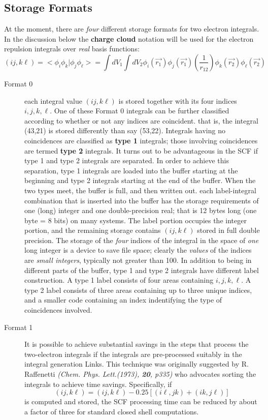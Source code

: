 \subsection{\sf Storage Formats}
At the moment, there are {\em four} different storage formats for two
electron integrals. In the  discussion below 
the {\bf charge cloud} notation will be used for
the electron repulsion integrals over {\em real} basis functions:
\[
(i j , k \ell ) =
 < \phi_i \phi_k | \phi_j \phi_{\ell} > = 
\int { dV_1 \int { dV_2 \phi_i (\vec{r_1})\phi_j (\vec{r_1})
\left ( \frac{1}{r_{12}} \right )
\phi_k (\vec{r_2})\phi_{\ell} (\vec{r_2}) } }
\]
\begin{description}
\item[Format 0] each integral value $(ij,k \ell )$ 
is stored together with its four
indices $ i , j , k , \ell $.
One of these Format 0 integrals can be further classified 
according to whether or not any
indices are coincident. that is, the integral (43,21) is stored
differently than say (53,22). Integrals having no coincidences are
classified as {\bf type 1} integrals; those involving coincidences are
termed {\bf type 2} integrals.
It turns out to be advantageous in the SCF if type 1 and type 2
integrals are separated. In order to achieve this separation, type 1
integrals are loaded into the buffer starting at the beginning and
type 2 integrals starting at the end of the buffer. When the two types
meet, the buffer is full, and then written out.
each label-integral combination that is inserted into the buffer
has the storage requirements of
one (long) integer and one double-precision real;
that is 12 bytes long (one byte = 8 bits) on many systems. 
The label portion occupies the
integer portion, and the remaining storage contains $(ij,k \ell )$ stored in
full double precision. 
The storage of the {\em four} indices of
the integral in the space of {\em one}
long integer is a device to save file space;
clearly the {\em values} of the indices are {\em small integers},
typically not greater than 100. 
In addition to being in different parts of the
buffer, type 1 and type 2 integrals have different label construction.
A type 1 label consists of four areas containing $ i,j,k, \ell $. 
A type
2 label consists of three areas containing up to three unique
indices, and a smaller code  containing an index indentifying the
type of coincidences involved.
\item[Format 1] It is possible to achieve substantial savings in the
steps that process the two-electron integrals if the integrals are
pre-processed suitably in the integral generation Links. 
This technique was
originally suggested by R.  Raffenetti {\em (Chem. Phys. Lett.(1973), {\bf 20},
p335)}
who advocates sorting the integrals to achieve time savings. Specifically,
if 
\begin{equation}
(i j ,k \ell ) = ( i j , k \ell )
- 0.25 [ (i \ell , j k ) + (i k , j \ell ) ]
\label{raff1}
\end{equation}
is computed and stored,
the SCF processing time can be reduced by about a factor of three for
standard closed shell computations.


\end{description}
